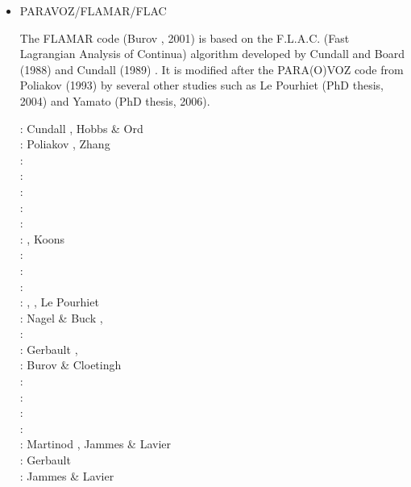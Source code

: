 \begin{itemize}
\item PARAVOZ/FLAMAR/FLAC 

The FLAMAR code (Burov \etal, 2001) is based on the
F.L.A.C. (Fast Lagrangian Analysis of Continua) algorithm developed by Cundall and Board (1988) 
and Cundall (1989) \cite{cund89}. It is modified after the PARA(O)VOZ code from 
Poliakov \etal (1993) \cite{pocp93} by several
other studies such as Le Pourhiet (PhD thesis, 2004) and Yamato (PhD thesis, 2006).

\begin{scriptsize}
\nineteeneightynine: Cundall \cite{cund89}, Hobbs \& Ord \cite{hoor89}\\
\nineteenninetythree: Poliakov \etal \cite{pocp93}, Zhang \etal \cite{zhhj93}\\
\nineteenninetyfour: \cite{wizh94}\\
\nineteenninetysix: \cite{zhho96}\\
\nineteenninetyeight: \cite{gepd98}\\
\twothousand: \cite{labp00}\\
\twothousandone: \cite{bujl01}\cite{bupo01}\\
\twothousandtwo: \cite{bast02}\cite{clbb02}, Koons \etal \cite{kozc02}\\
\twothousandthree: \cite{hags03}\cite{gehd03}\cite{upke03}\\
\twothousandfour: \cite{guhl04}\cite{gewi04}\cite{toba04}\cite{tibb04}\cite{clbm04}\cite{tobj04}\\
\twothousandfive: \cite{bugu05}\\
\twothousandsix: \cite{buwa06}, \cite{lemm06}, Le Pourhiet \etal \cite{legs06}\\
\twothousandseven: Nagel \& Buck \cite{nabu07}, \cite{yaab07}\cite{buto07}\cite{chem07}\\
\twothousandeight: \cite{yaba08}\cite{tibb08}\cite{buya08}\\
\twothousandnine: Gerbault \etal \cite{gecm09}, \cite{yahb09}\cite{bucl09}\cite{tigv09}\cite{yamb09}\\
\twothousandten: Burov \& Cloetingh \cite{bucl10}\\
\twothousandtwelve: \cite{anwb12}\cite{gech12}\cite{gubc12}\cite{gerb12}\\
\twothousandthirteen: \cite{wabd13}\cite{frbm13}\cite{tibb13}\\
\twothousandfourteen: \cite{frba14}\cite{gagb14}\cite{bufa14}\cite{bufy14b}\\
\twothousandfifteen: \cite{wulc15}\cite{gebw15}\cite{svlh15}\\
\twothousandsixteen: Martinod \etal \cite{marl16}, Jammes \& Lavier \cite{jala16}\\
\twothousandeighteen: Gerbault \etal \cite{gesr18}\\
\twothousandnineteen: Jammes \& Lavier \cite{jala19}
\end{scriptsize}


\end{itemize}
